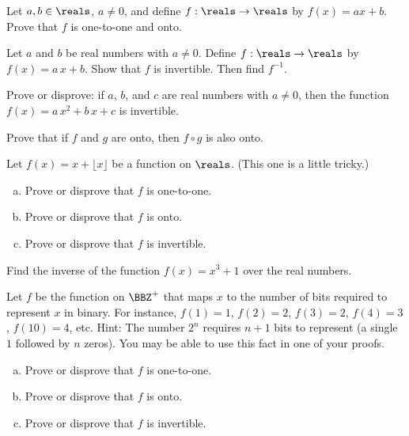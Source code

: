 \begin{pro}
Let $a,b\in\reals$, $a\neq 0$, and define $f:\reals\to\reals$ by $f(x)=ax+b$.
Prove that $f$ is one-to-one and onto.
\end{pro}

\begin{pro}
Let $a$ and $b$ be real numbers with $a\neq 0$.
Define $f:\reals\to\reals$ by $f(x)=a\, x + b$.
Show that $f$ is invertible. Then find $f^{-1}$.
\end{pro}

\begin{pro}
Prove or disprove: if $a$, $b$, and $c$ are real numbers with $a\neq 0$,
then the function $f(x)=a\,x^2+b\, x + c$ is invertible.
\end{pro}

\begin{pro} 
Prove that if $f$ and $g$ are onto, then $f\circ g$ is also onto.
\end{pro}

\begin{pro}
Let $f(x)=x+\lfloor x\rfloor$ be a function on $\reals$. (This one is a little tricky.)
\begin{enumerate}[(a)]
\item Prove or disprove that $f$ is one-to-one.
\item Prove or disprove that $f$ is onto.
\item Prove or disprove that $f$ is invertible.
\end{enumerate}
\end{pro}

\begin{pro}
Find the inverse of the function $f(x)=x^3+1$ over the real numbers.
\end{pro}

\begin{pro}
Let $f$ be the function on $\BBZ^{+}$ that maps  $x$ to the number of
bits required to represent $x$ in binary.  For instance, $f(1)=1$, $f(2)=2$, 
$f(3)=2$, $f(4)=3$, $f(10)=4$, etc.  
Hint:  The number $2^n$ requires $n+1$ bits to represent (a single $1$ followed
by $n$ zeros).  You may be able to use this fact in one of your proofs.
\begin{enumerate}[(a)]
\item Prove or disprove that $f$ is one-to-one.
\item Prove or disprove that $f$ is onto.
\item Prove or disprove that $f$ is invertible.
\end{enumerate}
\end{pro}

